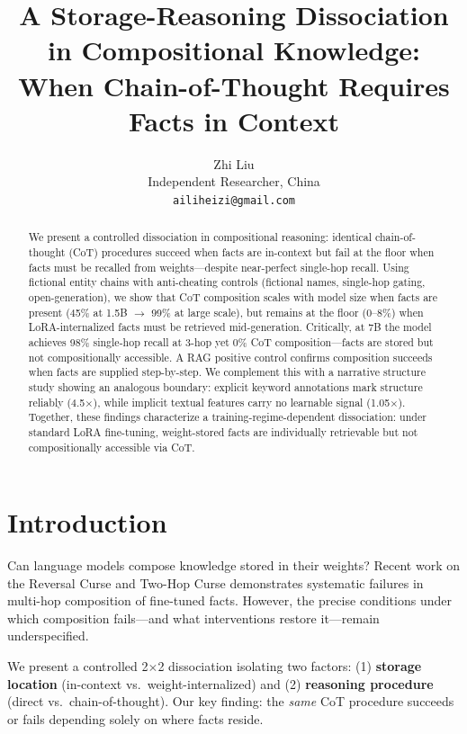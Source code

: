 \documentclass[11pt]{article}
\title{A Storage-Reasoning Dissociation in Compositional Knowledge:\\When Chain-of-Thought Requires Facts in Context}
\author{Zhi Liu \\ Independent Researcher, China \\ \texttt{ailiheizi@gmail.com}}
\begin{document}
\maketitle

\begin{abstract}
We present a controlled dissociation in compositional reasoning: identical chain-of-thought (CoT) procedures succeed when facts are in-context but fail at the floor when facts must be recalled from weights---despite near-perfect single-hop recall. Using fictional entity chains with anti-cheating controls (fictional names, single-hop gating, open-generation), we show that CoT composition scales with model size when facts are present (45\% at 1.5B $\rightarrow$ 99\% at large scale), but remains at the floor (0--8\%) when LoRA-internalized facts must be retrieved mid-generation. Critically, at 7B the model achieves 98\% single-hop recall at 3-hop yet 0\% CoT composition---facts are stored but not compositionally accessible. A RAG positive control confirms composition succeeds when facts are supplied step-by-step. We complement this with a narrative structure study showing an analogous boundary: explicit keyword annotations mark structure reliably (4.5$\times$), while implicit textual features carry no learnable signal (1.05$\times$). Together, these findings characterize a training-regime-dependent dissociation: under standard LoRA fine-tuning, weight-stored facts are individually retrievable but not compositionally accessible via CoT.
\end{abstract}

\section{Introduction}

Can language models compose knowledge stored in their weights? Recent work on the Reversal Curse \cite{berglund2023reversal} and Two-Hop Curse \cite{balesni2024twohop} demonstrates systematic failures in multi-hop composition of fine-tuned facts. However, the precise conditions under which composition fails---and what interventions restore it---remain underspecified.

We present a controlled 2$\times$2 dissociation isolating two factors: (1) \textbf{storage location} (in-context vs.\ weight-internalized) and (2) \textbf{reasoning procedure} (direct vs.\ chain-of-thought). Our key finding: the \emph{same} CoT procedure succeeds or fails depending solely on where facts reside.
\end{document}
